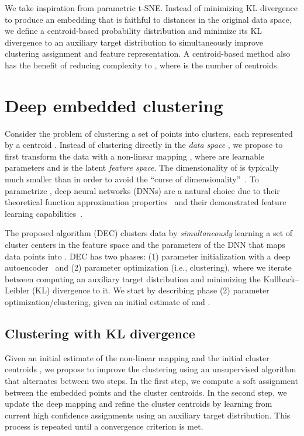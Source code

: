 \documentclass{article}
\begin{document}
We take inspiration from parametric t-SNE. Instead of minimizing KL divergence to produce an embedding that is faithful to distances in the original data space, we define a centroid-based probability distribution and minimize its KL divergence to an auxiliary target distribution to simultaneously improve clustering assignment and feature representation. A centroid-based method also has the benefit of reducing complexity to , where  is the number of centroids.
 \section{Deep embedded clustering}
Consider the problem of clustering a set of  points  into  clusters, each represented by a centroid .
Instead of clustering directly in the \emph{data space} , we propose to first transform the data with a non-linear mapping , where  are learnable parameters and  is the latent \emph{feature space}.
The dimensionality of  is typically much smaller than  in order to avoid the ``curse of dimensionality''~\citep{bellman61}.
To parametrize , deep neural networks (DNNs) are a natural choice due to their theoretical function approximation properties~\citep{hornik1991approximation} and their demonstrated feature learning capabilities~\citep{bengio2013representation}.

The proposed algorithm (DEC) clusters data by \emph{simultaneously} learning a set of  cluster centers  in the feature space  and the parameters  of the DNN that maps data points into . DEC has two phases: (1) parameter initialization with a deep autoencoder~\citep{vincent2010stacked} and (2) parameter optimization (i.e., clustering), where we iterate between computing an auxiliary target distribution and minimizing the Kullback--Leibler (KL) divergence to it. We start by describing phase (2) parameter optimization/clustering, given an initial estimate of  and .

\subsection{Clustering with KL divergence}
Given an initial estimate of the non-linear mapping  and the initial cluster centroids , we propose to improve the clustering using an unsupervised algorithm that alternates between two steps.
In the first step, we compute a soft assignment between the embedded points and the cluster centroids. In the second step, we update the deep mapping  and refine the cluster centroids by learning from current high confidence assignments using an auxiliary target distribution.
This process is repeated until a convergence criterion is met.
\end{document}
